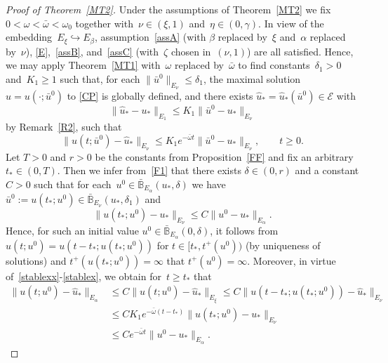 \documentclass[reqno,11pt]{amsart}
\numberwithin{equation}{section}
\theoremstyle{remark}
\begin{document}
\begin{proof}[Proof of Theorem~\ref{MT2}]
Under the  assumptions of Theorem~\ref{MT2} we fix $ 0<\omega<\bar\omega<\omega_0$ together with~${\nu\in(\xi,1)}$ and~${\eta\in(0,\gamma)}$.
In view of the embedding~$E_\xi\hookrightarrow E_\beta$, assumption~\eqref{assA} (with $\beta$ replaced by~$\xi$ and~$\alpha$ replaced by~$\nu$), \eqref{E},~\eqref{assB}, and~\eqref{assC} 
(with~$\zeta$ chosen in~$(\nu,1)$) are all satisfied. 
Hence, we may apply  Theorem~\ref{MT1} with~$\omega$ replaced  by~$\bar\omega$   to find constants~$\delta_1>0$ and~$K_1\ge 1$ such that, 
 for each $\|\bar u^0\|_{E_\nu }\leq \delta_1$, the maximal solution~${u=u(\cdot; \bar u^0)}$ to \eqref{CP}  is globally defined, and there exists $\hat u_*=\hat u_*(\bar u^0)\in \mathcal{E}$ with 
 \begin{equation}\label{u2+}
 \|\hat u_*-u_*\|_{E_1}\leq K_1\|\bar u^0-u_*\|_{E_\nu}
 \end{equation}
 by Remark~\ref{R2}, such that  
\begin{equation}\label{stablexx}
\|u(t;\bar u^0)-\hat u_*\|_{E_\nu }\le K_1 e^{-\bar\omega t}\|\bar u^0-u_*\|_{E_\nu },\qquad t\ge 0.
\end{equation}
Let $T> 0$ and $r>0$ be the constants from Proposition~\ref{FF}  and fix an arbitrary $t_*\in (0,T)$.
 Then  we infer from~\eqref{F1} that there exists $\delta\in (0,r)$  and a constant $C>0$ such that for each~$u^0\in \bar{\mathbb{B}}_{E_\alpha }(u_*,\delta)$ 
 we have $\bar u^0:=u(t_*;u^0)\in  \bar{\mathbb{B}}_{E_\nu}(u_*, \delta_1)$ and
\begin{equation}\label{stablex}
\|u(t_*;u^0)-u_*\|_{E_\nu }\le C\|u^0-u_*\|_{E_\alpha}.
\end{equation}
Hence, for such an initial value $u^0\in  \bar{\mathbb{B}}_{E_\alpha }(0,\delta)$,  it follows from $u(t;u^0)=u(t-t_*;u(t_*;u^0))$ for $t\in [t_*,t^+(u^0))$ (by uniqueness of solutions) and $t^+(u(t_*;u^0))=\infty$ that $t^+(u^0)=\infty$.
Moreover, in virtue of~\eqref{stablexx}-\eqref{stablex}, we obtain for~$t\geq t_*$ that
\begin{equation}\label{df}
\begin{aligned}
\|u(t;u^0)-\hat u_*\|_{E_\alpha}&\le C\|u(t;u^0)-\hat u_*\|_{E_\xi } \leq  C \|u(t-t_*;u(t_*;u^0))-\hat u_*\|_{E_\nu }\\
&\le CK_1 e^{-\bar\omega (t-t_*)}\|u(t_*;u^0)-u_*\|_{E_\nu }\\
&\le C  e^{-\bar\omega t}\|u^0-u_*\|_{E_\alpha }. 
\end{aligned}
\end{equation}

\end{proof}
\end{document}
